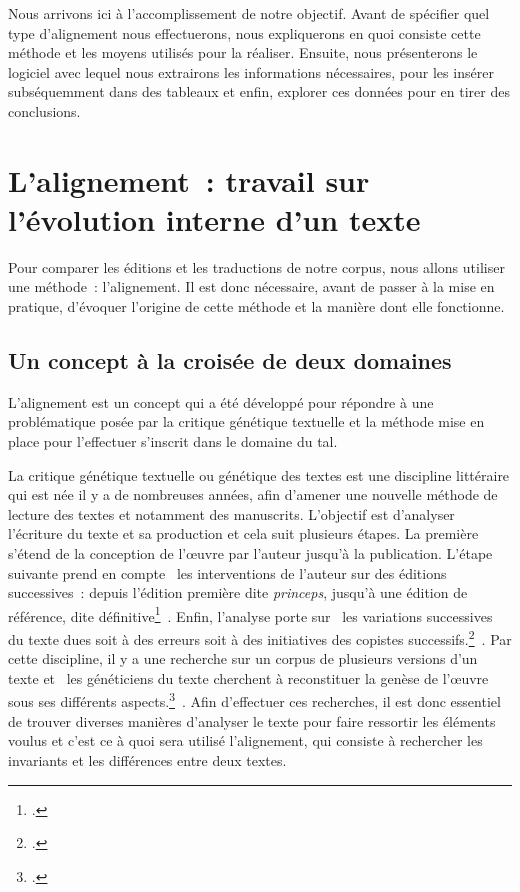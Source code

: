 
Nous arrivons ici à l'accomplissement de notre objectif. Avant de spécifier quel type d'alignement nous effectuerons, nous expliquerons en quoi consiste cette méthode et les moyens utilisés pour la réaliser. Ensuite, nous présenterons le logiciel avec lequel nous extrairons les informations nécessaires, pour les insérer subséquemment dans des tableaux et enfin, explorer ces données pour en tirer des conclusions.

\section{L'alignement~: travail sur l'évolution interne d'un texte}
Pour comparer les éditions et les traductions de notre corpus, nous allons utiliser une méthode~: l'alignement. Il est donc nécessaire, avant de passer à la mise en pratique, d'évoquer l'origine de cette méthode et la manière dont elle fonctionne.

\subsection{Un concept à la croisée de deux domaines}
L'alignement est un concept qui a été développé pour répondre à une problématique posée par la critique génétique textuelle et la méthode mise en place pour l'effectuer s'inscrit dans le domaine du \acrfull{tal}.

La critique génétique textuelle ou génétique des textes est une discipline littéraire qui est née il y a de nombreuses années, afin d'amener une nouvelle méthode de lecture des textes et notamment des manuscrits. L'objectif est d'analyser l'écriture du texte et sa production et cela suit plusieurs étapes. La première s'étend de la conception de l'œuvre par l'auteur jusqu'à la publication. L'étape suivante prend en compte \og~les interventions de l'auteur sur des éditions successives~: depuis l'édition première dite \textit{princeps}, jusqu'à une édition de référence, dite définitive\footcite[p.~1]{genetique_texte}~\fg{}. Enfin, l'analyse porte sur \og~les variations successives du texte dues soit à des erreurs soit à des initiatives des copistes successifs.\footcite[p.~1]{genetique_texte}~\fg{}. Par cette discipline, il y a une recherche sur un corpus de plusieurs versions d'un texte et \og~les généticiens du texte cherchent à reconstituer la genèse de l'œuvre sous ses différents aspects.\footcite{alignement_bourdaillet}~\fg{}. Afin d'effectuer ces recherches, il est donc essentiel de trouver diverses manières d'analyser le texte pour faire ressortir les éléments voulus et c'est ce à quoi sera utilisé l'alignement, qui consiste à rechercher les invariants et les différences entre deux textes.

